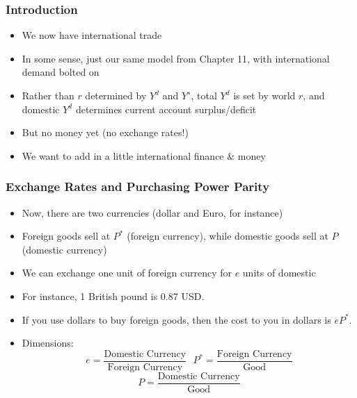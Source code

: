 \documentclass{beamer}
\author{Trevor S. Gallen}
\date{}
\begin{document}
\renewcommand*{\inserttotalframenumber}{\pageref{lastframe}}



\begin{frame}
\titlepage
\end{frame}

\begin{frame}
\frametitle[alignment=center]{Introduction}
\begin{itemize}
\item We now have international trade
\bigskip
\item In some sense, just our same model from Chapter 11, with international demand bolted on
\bigskip
\item Rather than $r$ determined by $Y^d$ and $Y^s$, total $Y^d$ is set by world $r$, and domestic $Y^d$ determines current account surplus/deficit
\bigskip
\item But no money yet (no exchange rates!)
\bigskip
\item We want to add in a little international finance \& money
\end{itemize}
\end{frame}

\begin{frame}
\frametitle[alignment=center]{Exchange Rates and Purchasing Power Parity}
\begin{itemize}
\item Now, there are two currencies (dollar and Euro, for instance)
\bigskip
\item Foreign goods sell at $P^*$ (foreign currency), while domestic goods sell at $P$ (domestic currency)
\bigskip
\item We can exchange one unit of foreign currency for $e$ units of domestic
\bigskip
\item For instance, 1 British pound is 0.87 USD.
\bigskip
\item If you use dollars to buy foreign goods, then the cost to you in dollars is $eP^*$.
\bigskip
\item Dimensions:
$$e=\frac{\text{Domestic Currency}}{\text{Foreign Currency}}\ \ \ P^*=\frac{\text{Foreign Currency}}{\text{Good}}$$
$$P=\frac{\text{Domestic Currency}}{\text{Good}}$$
\end{itemize}
\end{frame}
\end{document}
